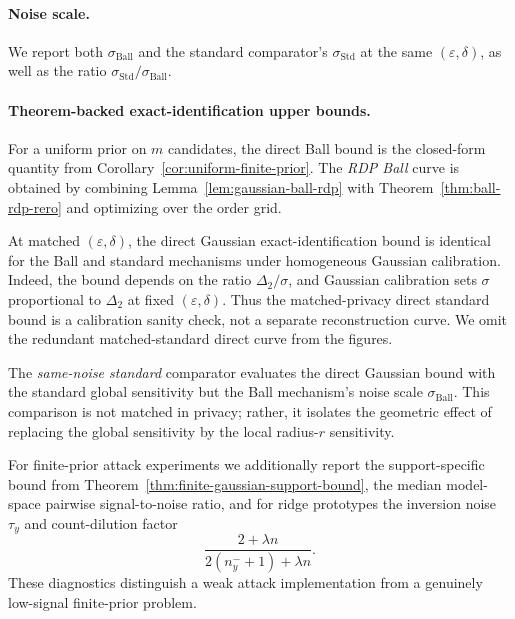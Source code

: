\documentclass[conference,compsoc]{IEEEtran}
\begin{document}
\paragraph{Noise scale.}
We report both $\sigma_{\mathrm{Ball}}$ and the standard comparator's $\sigma_{\mathrm{Std}}$ at the same $(\varepsilon,\delta)$, as well as the ratio $\sigma_{\mathrm{Std}}/\sigma_{\mathrm{Ball}}$.

\paragraph{Theorem-backed exact-identification upper bounds.}
For a uniform prior on $m$ candidates, the direct Ball bound is the closed-form quantity from Corollary~\ref{cor:uniform-finite-prior}. The \emph{RDP Ball} curve is obtained by combining Lemma~\ref{lem:gaussian-ball-rdp} with Theorem~\ref{thm:ball-rdp-rero} and optimizing over the order grid.

At matched $(\varepsilon,\delta)$, the direct Gaussian exact-identification bound is identical for the Ball and standard mechanisms under homogeneous Gaussian calibration. Indeed, the bound depends on the ratio $\Delta_2/\sigma$, and Gaussian calibration sets $\sigma$ proportional to $\Delta_2$ at fixed $(\varepsilon,\delta)$. Thus the matched-privacy direct standard bound is a calibration sanity check, not a separate reconstruction curve. We omit the redundant matched-standard direct curve from the figures.

The \emph{same-noise standard} comparator evaluates the direct Gaussian bound with the standard global sensitivity but the Ball mechanism's noise scale $\sigma_{\mathrm{Ball}}$. This comparison is not matched in privacy; rather, it isolates the geometric effect of replacing the global sensitivity by the local radius-$r$ sensitivity.

For finite-prior attack experiments we additionally report the support-specific bound from Theorem~\ref{thm:finite-gaussian-support-bound}, the median model-space pairwise signal-to-noise ratio, and for ridge prototypes the inversion noise $\tau_y$ and count-dilution factor
\[
\frac{2+\lambda n}{2(n_y^-+1)+\lambda n}.
\]
These diagnostics distinguish a weak attack implementation from a genuinely low-signal finite-prior problem.
\end{document}
